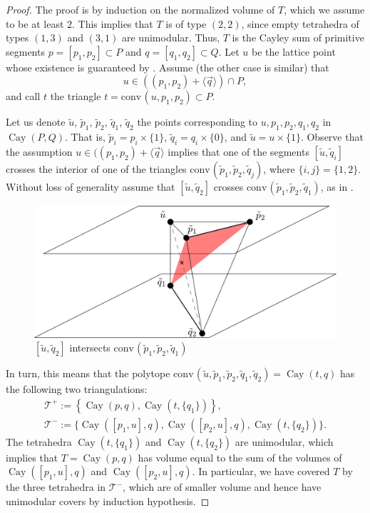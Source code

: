 \documentclass[12pt]{article}
\newcommand{\conv}{\ensuremath{\mathrm{conv}}\hspace{1pt}}
\newcommand{\cayley}{\operatorname{Cay}}
\newcommand{\vecline}[1]{\langle \vec #1 \rangle}
\begin{document}
\begin{proof}
The proof is by induction on the normalized volume of $T$, which we assume to be at least $2$. This implies that $T$ is of type $(2,2)$,
since empty tetrahedra of types $(1,3)$ and $(3,1)$ are unimodular. Thus, $T$ is the Cayley sum of primitive segments $p=[p_1,p_2]\subset P$ and $q=[q_1,q_2]\subset Q$.  
Let $u$ be the lattice point whose existence is guaranteed by . Assume  (the other case is similar) that 
\[
u \in ((p_1, p_2) + \vecline q ) \cap P,
\]
and call $t$ the triangle $t=\conv( u,  p_1,  p_2)\subset P$.

Let us denote $\tilde u$, $\tilde p_1$, $\tilde p_2$, $\tilde q_1$, $\tilde q_2$ the points corresponding to $u, p_1, p_2, q_1, q_2$ in $\cayley(P,Q)$.
That is, $\tilde p_i = p_i\times\{1\}$, $\tilde q_i = 	q_i\times\{0\}$, and $\tilde u = u\times\{1\}$.
Observe that the assumption $u\in((p_1, p_2) + \vecline q$ implies that one of the segments $[\tilde u,\tilde q_i]$ crosses the interior of one of the triangles $\conv(\tilde p_1,\tilde p_2,\tilde q_j)$, where $\{i,j\}=\{1,2\}$. Without loss of generality assume that $[\tilde{u},\tilde{q}_2]$ crosses $\conv(\tilde{p}_1,\tilde{p}_2,\tilde{q}_1)$, as in . 

\begin{figure}[htb]
\includegraphics[scale=.3]{flip}
\caption{$[\tilde{u},\tilde{q}_2]$ intersects $\conv(\tilde{p}_1,\tilde{p}_2,\tilde{q}_1)$}
\label{fig:flip}
\end{figure}

In turn, this means that the polytope $\conv(\tilde u, \tilde p_1, \tilde p_2, \tilde q_1, \tilde q_2) = \cayley(t,q)$
 has the following two triangulations:
\begin{gather*}
\mathcal T^+:= \left\{ \cayley(p,q), \cayley(t, \{q_1\}) \right\},
\\
\mathcal T^-:= \{ \cayley([p_1,u],q), \cayley([p_2,u],q), \cayley(t, \{q_2\}) \}.
\end{gather*}
The tetrahedra $\cayley(t, \{q_1\})$ and $\cayley(t, \{q_2\})$ are unimodular, which implies that $T=\cayley(p,q)$ has volume equal to the sum of the volumes of $\cayley([p_1,u],q)$ and $\cayley([p_2,u],q)$. In particular, we have covered $T$ by the three tetrahedra in $\mathcal T^-$, which are of smaller volume and hence have unimodular covers by induction hypothesis.
\end{proof}
\end{document}
